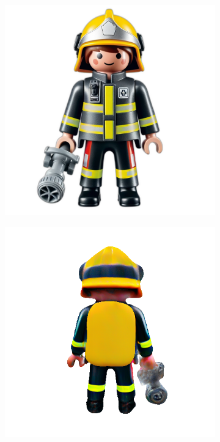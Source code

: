 \begin{figure}[ht]
    \centering
    \small
    \begin{subfigure}[b]{0.25\textwidth}
        \centering
        \includegraphics[width=\textwidth]{etc/Images/playmobil.png}
        \caption{}
    \end{subfigure}
    \begin{subfigure}[b]{0.25\textwidth}
        \centering
        \includegraphics[width=\textwidth]{etc/a high quality rendering of a playmobil firefighter/magic123/magic123_playmobil_refine_back_10000_part1.png}

\end{subfigure}
\end{figure}
